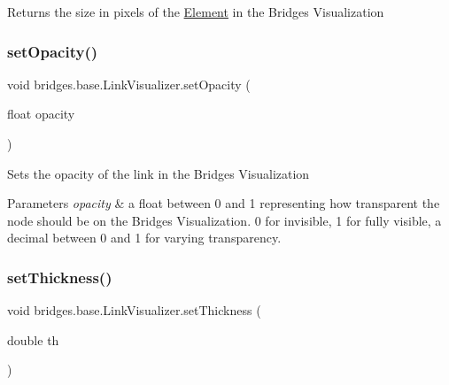 \begin{DoxyReturn}{Returns}
the size in pixels of the \hyperlink{classbridges_1_1base_1_1_element}{Element} in the Bridges Visualization 
\end{DoxyReturn}
\hypertarget{classbridges_1_1base_1_1_link_visualizer_ac0d59614dbc65ed0a19c25c493a1deaa}{}\label{classbridges_1_1base_1_1_link_visualizer_ac0d59614dbc65ed0a19c25c493a1deaa} 
\subsubsection{\texorpdfstring{set\+Opacity()}{setOpacity()}}
{\footnotesize\ttfamily void bridges.\+base.\+Link\+Visualizer.\+set\+Opacity (\begin{DoxyParamCaption}\item[{float}]{opacity }\end{DoxyParamCaption})}

Sets the opacity of the link in the Bridges Visualization


\begin{DoxyParams}{Parameters}
{\em opacity} & a float between 0 and 1 representing how transparent the node should be on the Bridges Visualization. 0 for invisible, 1 for fully visible, a decimal between 0 and 1 for varying transparency. \\
\hline
\end{DoxyParams}
\hypertarget{classbridges_1_1base_1_1_link_visualizer_a702e9ca345d1a4a035baf2041f275849}{}\label{classbridges_1_1base_1_1_link_visualizer_a702e9ca345d1a4a035baf2041f275849} 
\subsubsection{\texorpdfstring{set\+Thickness()}{setThickness()}}
{\footnotesize\ttfamily void bridges.\+base.\+Link\+Visualizer.\+set\+Thickness (\begin{DoxyParamCaption}\item[{double}]{th }\end{DoxyParamCaption})}

